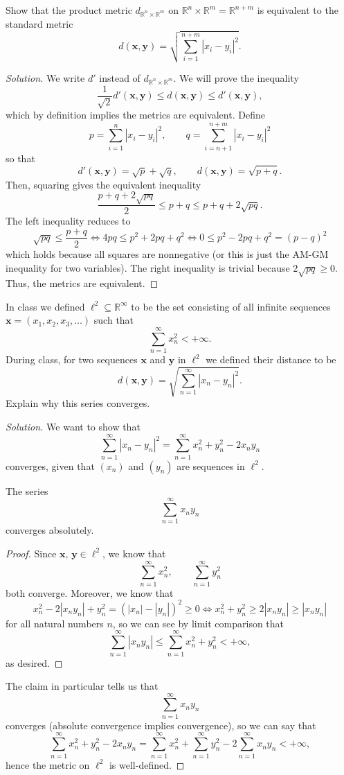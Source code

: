 \documentclass[11pt]{scrartcl}
\providecommand{\RR}{\mathbb R}
\theoremstyle{problem}
\newenvironment{problem}[1]
{\renewcommand\theinnercustomthm{#1}\innercustomthm}
{\endinnercustomthm}
\theoremstyle{remark}
\newenvironment{soln}{\begin{proof}[Solution]}{\end{proof}}
\begin{document}
\begin{problem}{8}
	Show that the product metric $d_{\RR^n\times\RR^m}$ on
	$\RR^n\times\RR^m = \RR^{n+m}$ is equivalent to the standard metric
	\[d(\mathbf x, \mathbf y) = \sqrt{\sum_{i=1}^{n+m} |x_i - y_i|^2}.\]
\end{problem}

\begin{soln}
	We write $d'$ instead of $d_{\RR^n\times\RR^m}$.
	We will prove the inequality
	\[\frac{1}{\sqrt 2} d'(\mathbf x, \mathbf y) \le
	d(\mathbf x, \mathbf y) \le d'(\mathbf x, \mathbf y),\]
	which by definition implies the metrics are equivalent. Define
	\[p = \sum_{i=1}^n |x_i - y_i|^2,\qquad q = \sum_{i=n+1}^{n+m} |x_i-y_i|^2\]
	so that
	\[d'(\mathbf x, \mathbf y) = \sqrt p + \sqrt q,\qquad
	d(\mathbf x, \mathbf y) = \sqrt{p+q}.\]
	Then, squaring gives the equivalent inequality
	\[\frac{p + q + 2\sqrt{pq}}{2} \le p + q \le p + q + 2\sqrt{pq}.\]
	The left inequality reduces to
	\[\sqrt{pq} \le \frac{p + q}{2}
	\iff 4pq \le p^2 + 2pq + q^2 \iff 0 \le p^2 - 2pq + q^2 = (p - q)^2\]
	which holds because all squares are nonnegative
	(or this is just the AM-GM inequality for two variables).
	The right inequality is trivial because $2\sqrt{pq} \ge 0$.
	Thus, the metrics are equivalent.
\end{soln}

\begin{problem}{9}
	In class we defined $\ell^2\subseteq\RR^\infty$ to be the set
	consisting of all infinite sequences $\mathbf x = (x_1, x_2, x_3, \dots)$
	such that
	\[\sum_{n=1}^\infty x_n^2 < +\infty.\]
	During class, for two sequences $\mathbf x$ and $\mathbf y$ in $\ell^2$
	we defined their distance to be
	\[d(\mathbf x, \mathbf y) = \sqrt{\sum_{n=1}^\infty |x_n - y_n|^2}.\]
	Explain why this series converges.
\end{problem}

\begin{soln}
	We want to show that
	\[\sum_{n=1}^\infty |x_n - y_n|^2 =
	\sum_{n=1}^\infty x_n^2 + y_n^2 - 2x_ny_n\]
	converges, given that $(x_n)$ and $(y_n)$ are sequences in $\ell^2$.
	
	\begin{claim*}
		The series
		\[\sum_{n=1}^\infty x_ny_n\]
		converges absolutely.
	\end{claim*}
	\begin{proof}
		Since $\mathbf x,\,\mathbf y\in\ell^2$, we know that
		\[\sum_{n=1}^\infty x_n^2,\qquad \sum_{n=1}^\infty y_n^2\]
		both converge.
		Moreover, we know that
		\[x_n^2 - 2|x_ny_n| + y_n^2 = (|x_n| - |y_n|)^2 \ge 0
		\iff x_n^2 + y_n^2 \ge 2|x_ny_n| \ge |x_ny_n|\]
		for all natural numbers $n$, so we can see by limit comparison that
		\[\sum_{n=1}^\infty |x_ny_n| \le \sum_{n=1}^\infty x_n^2 + y_n^2
		< +\infty,\]
		as desired.
	\end{proof}
	
	The claim in particular tells us that
	\[\sum_{n=1}^\infty x_ny_n\]
	converges (absolute convergence implies convergence), so we can say that
	\[\sum_{n=1}^\infty x_n^2 + y_n^2 - 2x_ny_n =
	\sum_{n=1}^\infty x_n^2 + \sum_{n=1}^\infty y_n^2 -
	2\sum_{n=1}^\infty x_ny_n < +\infty,\]
	hence the metric on $\ell^2$ is well-defined.
\end{soln}
\end{document}

